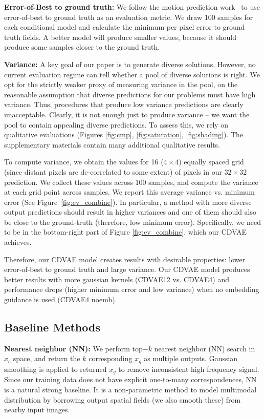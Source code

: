 \documentclass[10pt,twocolumn,letterpaper]{article}
\begin{document}
\textbf{Error-of-Best to ground truth:} We follow the motion prediction work~\cite{walker2016uncertain} to use 
error-of-best to ground truth as an evaluation metric. We draw 100 samples for each conditional model and calculate 
the minimum per pixel error to ground truth fields. A better model will produce smaller values, because it 
should produce some samples closer to the ground truth.

\textbf{Variance:} 
A key goal of our paper is to generate diverse solutions. However, no current evaluation regime can tell 
whether a pool of diverse solutions is right. We opt for the strictly weaker proxy of measuring variance
in the pool, on the reasonable assumption that diverse predictions for our problems must have high variance.
Thus, procedures that produce low variance predictions are clearly unacceptable. Clearly, it is not enough
just to produce variance -- we want the pool to contain appealing diverse predictions. To assess this, 
we rely on qualitative evaluations (Figures \ref{fig:cmp}, \ref{fig:saturation}, \ref{fig:shading}).
The supplementary materials contain many additional qualitative results.

To compute variance, we obtain the values for 16 ($4 \times 4$) equally spaced grid 
(since distant pixels are de-correlated to some extent) of pixels in our $32 \times 32$ 
prediction. We collect these values across 100 samples, and compute the variance at 
each grid point across samples. We report this average variance vs. minimum error 
(See Figure~\ref{fig:ev_combine}). In particular, a method with more diverse output 
predictions should result in higher variances and one of them should also be close
to the ground-truth (therefore, low minimum error). Specifically, we need to be in
the bottom-right part of Figure \ref{fig:ev_combine}, which our CDVAE achieves.
 
Therefore, our CDVAE model creates results with desirable properties: lower error-of-best 
to ground truth and large variance. Our CDVAE model produces better results with more 
gaussian kernels (CDVAE12 vs. CDVAE4) and performance drops (higher minimum error and 
low variance) when no embedding guidance is used (CDVAE4 noemb). 

\subsection{Baseline Methods}
\label{sec:baseline}

\textbf{Nearest neighbor (NN): } We perform top$-k$ nearest neighbor (NN) search in 
$x_c$ space, and return the $k$ corresponding $x_g$ as multiple outputs. Gaussian 
smoothing is applied to returned $x_g$ to remove inconsistent high frequency 
signal. Since our training data does not have explicit one-to-many correspondences, 
NN is a natural strong baseline. It is a non-parametric method to model multimodal
distribution by borrowing output spatial fields (we also smooth these) from nearby 
input images.
\end{document}
